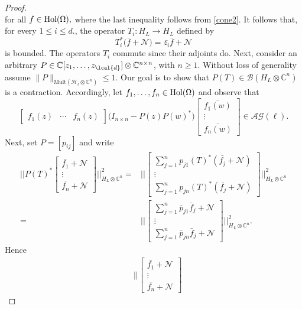 \documentclass[a4paper,reqno,index]{amsart}
\numberwithin{equation}{section}
\newcommand{\CC}{\mathbb{C}}
\theoremstyle{definition}
\begin{document}
\begin{proof}
\[\]
 for all $f\in \textup{Hol}(\Omega),$
where the last inequality follows from \eqref{cone2}.
It follows that, for every $1\le i\le d.$, the operator $T_i:H_L\to H_L$ defined by 
\[T^*_i\big(\bar{f}+\mathcal{N}\big)=\bar{z_i}\bar{f}+\mathcal{N}\]
is bounded. The operators $T_i$ commute since their adjoints do. Next, consider an arbitrary $P\in \CC[z_1, \dots, z_{\lcal{d}}]\otimes\mathbb{C}^{n\times n}$, with $n\ge 1.$ Without loss of generality assume $\|P\|_{\text{Mult}(\mathcal{H}_{\ell}\otimes\mathbb{C}^n)}\le 1$. Our goal is to show that $P(T)\in \mathcal{B}(H_L\otimes\mathbb{C}^n)$
is a contraction. Accordingly, let  $f_1, \dots, f_n\in \textup{Hol}(\Omega)$ and observe that
\begin{equation}\label{key}
\begin{bmatrix}
 f_1(z)& \cdots & f_n(z)   
\end{bmatrix}\big(I_{n\times n}-P(z)P(w)^* \big)\begin{bmatrix}
\overline{f_1(w)} \\ 
\vdots \\
\overline{f_n(w)} 
\end{bmatrix}\in  \mathcal{AG}(\ell).
\end{equation}
Next, set $P=[p_{ij}]$ and write
\begin{align*}
\Bigg|\Bigg|P(T)^*\begin{bmatrix}
\bar{f_1}+\mathcal{N} \\ \vdots \\\bar{f_n}+\mathcal{N}
\end{bmatrix}\Bigg|\Bigg|^2_{H_L\otimes\mathbb{C}^n}
=&\Bigg|\Bigg|\begin{bmatrix}
\sum_{j=1}^np_{j1}(T)^*(\bar{f_j}+\mathcal{N}) \\ \vdots \\ \sum_{j=1}^np_{jn}(T)^*(\bar{f_j}+\mathcal{N})
\end{bmatrix}\Bigg|\Bigg|^2_{H_L\otimes\mathbb{C}^n}
\\
=&\Bigg|\Bigg|\begin{bmatrix}
\sum_{j=1}^n\overline{p}_{j1}\bar{f}_j+\mathcal{N} \\ \vdots \\ \sum_{j=1}^n\overline{p}_{jn}\bar{f}_j+\mathcal{N}
\end{bmatrix}\Bigg|\Bigg|^2_{H_L\otimes\mathbb{C}^n}.
\end{align*}
Hence 
\begin{align*}
&\ \Bigg|\Bigg|\begin{bmatrix}
\bar{f_1}+\mathcal{N} \\ \vdots \\\bar{f_n}+\mathcal{N}

\end{bmatrix}
\end{align*}
\end{proof}
\end{document}

